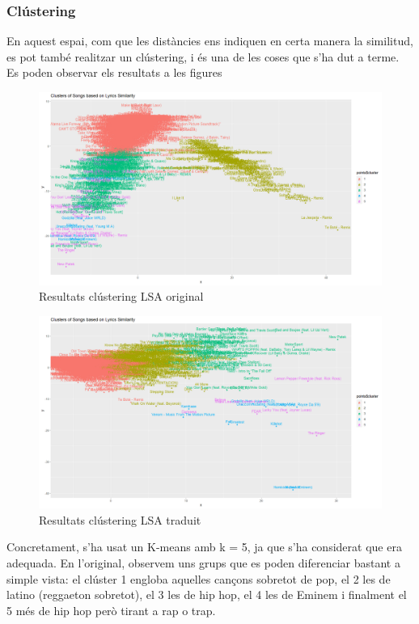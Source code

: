 \subsubsection{Clústering}

En aquest espai, com que les distàncies ens indiquen en certa manera la similitud, es pot també realitzar un clústering, i és una de les coses que s'ha dut a terme. Es poden observar els resultats a les figures


\begin{figure}[H]
    \centering
    \includegraphics[width=0.8\linewidth]{Images//8_Textual//LSA/original_kmeans_clustering.png}
    \caption{Resultats clústering LSA original}
    \label{fig:textual_lsa_clustering_orig}
\end{figure}

\begin{figure}[H]
    \centering
    \includegraphics[width=0.8\linewidth]{Images//8_Textual//LSA/kmeans_clustering.png}
    \caption{Resultats clústering LSA traduit}
    \label{fig:textual_lsa_clustering_trad}
\end{figure}

Concretament, s'ha usat un K-means amb k = 5, ja que s'ha considerat que era adequada. En l'original, observem uns grups que es poden diferenciar bastant a simple vista: el clúster 1 engloba aquelles cançons sobretot de pop, el 2 les de latino (reggaeton sobretot), el 3 les de hip hop, el 4 les de Eminem i finalment el 5 més de hip hop però tirant a rap o trap.

